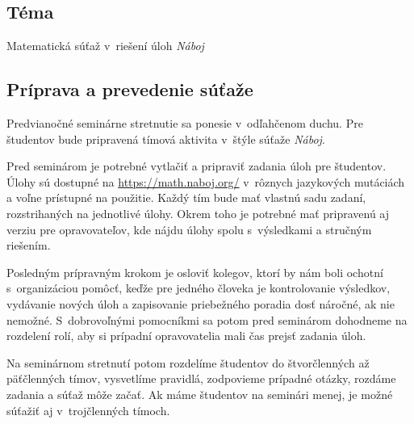 
\subsection*{Téma}
Matematická súťaž v~riešení úloh \textit{Náboj}

\subsection*{Príprava a prevedenie súťaže}
Predvianočné seminárne stretnutie sa ponesie v~odľahčenom duchu. Pre študentov bude pripravená tímová aktivita v~štýle súťaže \textit{Náboj}.

Pred seminárom je potrebné vytlačiť a pripraviť zadania úloh pre študentov. Úlohy sú dostupné na \url{https://math.naboj.org/} v~rôznych jazykových mutáciách a voľne prístupné na použitie. Každý tím bude mať vlastnú sadu zadaní, rozstrihaných na jednotlivé úlohy. Okrem toho je potrebné mať pripravenú aj verziu pre
opravovateľov, kde nájdu úlohy spolu s~výsledkami a stručným riešením.

Posledným prípravným krokom je osloviť kolegov, ktorí by nám boli ochotní s~organizáciou pomôcť, keďže pre jedného človeka je kontrolovanie výsledkov, vydávanie nových úloh a zapisovanie priebežného poradia dosť náročné, ak nie nemožné. S~dobrovoľnými pomocníkmi sa potom pred seminárom dohodneme na rozdelení rolí, aby si prípadní opravovatelia mali čas prejsť zadania úloh.

Na seminárnom stretnutí potom rozdelíme študentov do štvorčlenných až päťčlenných tímov, vysvetlíme pravidlá, zodpovieme prípadné otázky, rozdáme zadania a súťaž môže začať. Ak máme študentov na seminári menej, je možné súťažiť aj v~trojčlenných tímoch.

